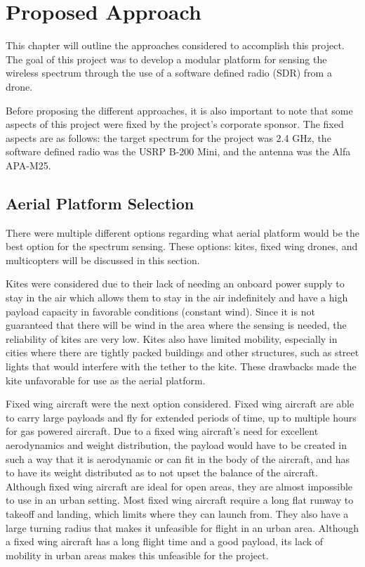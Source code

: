 \chapter{Proposed Approach}
This chapter will outline the approaches considered to accomplish this project. The goal of this project was to develop a modular platform for sensing the wireless spectrum through the use of a software defined radio (SDR) from a drone.

Before proposing the different approaches, it is also important to note that some aspects of this project were fixed by the project’s corporate sponsor. The fixed aspects are as follows: the target spectrum for the project was 2.4 GHz, the software defined radio was the USRP B-200 Mini, and the antenna was the Alfa APA-M25.

\section{Aerial Platform Selection}
There were multiple different options regarding what aerial platform would be the best option for the spectrum sensing. These options: kites, fixed wing drones, and multicopters will be discussed in this section. 

Kites were considered due to their lack of needing an onboard power supply to stay in the air which allows them to stay in the air indefinitely and have a high payload capacity in favorable conditions (constant wind). Since it is not guaranteed that there will be wind in the area where the sensing is needed, the reliability of kites are very low. Kites also have limited mobility, especially in cities where there are tightly packed buildings and other structures, such as street lights that would interfere with the tether to the kite. These drawbacks made the kite unfavorable for use as the aerial platform.

Fixed wing aircraft were the next option considered. Fixed wing aircraft are able to carry large payloads and fly for extended periods of time, up to multiple hours for gas powered aircraft. Due to a fixed wing aircraft's need for excellent aerodynamics and weight distribution, the payload would have to be created in such a way that it is aerodynamic or can fit in the body of the aircraft, and has to have its weight distributed as to not upset the balance of the aircraft. Although fixed wing aircraft are ideal for open areas, they are almost impossible to use in an urban setting. Most fixed wing aircraft require a long flat runway to takeoff and landing, which limits where they can launch from. They also have a large turning radius that makes it unfeasible for flight in an urban area. Although a fixed wing aircraft has a long flight time and a good payload, its lack of mobility in urban areas makes this unfeasible for the project.

